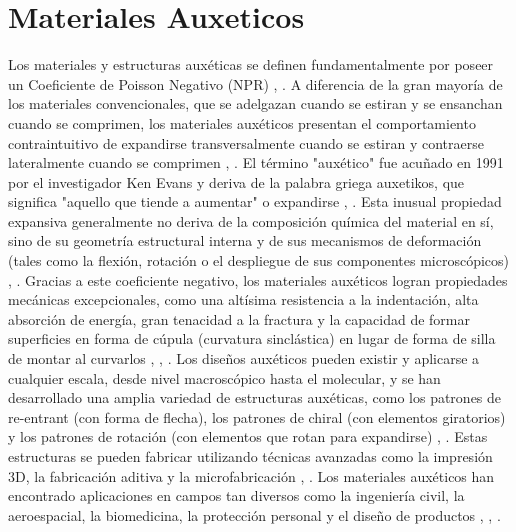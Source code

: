 \section{Materiales Auxeticos}
Los materiales y estructuras auxéticas se definen fundamentalmente por poseer un Coeficiente de Poisson Negativo (NPR) , . A diferencia de la gran mayoría de los materiales convencionales, que se adelgazan cuando se estiran y se ensanchan cuando se comprimen, los materiales auxéticos presentan el comportamiento contraintuitivo de expandirse transversalmente cuando se estiran y contraerse lateralmente cuando se comprimen , .
El término "auxético" fue acuñado en 1991 por el investigador Ken Evans y deriva de la palabra griega auxetikos, que significa "aquello que tiende a aumentar" o expandirse , . Esta inusual propiedad expansiva generalmente no deriva de la composición química del material en sí, sino de su geometría estructural interna y de sus mecanismos de deformación (tales como la flexión, rotación o el despliegue de sus componentes microscópicos) , . Gracias a este coeficiente negativo, los materiales auxéticos logran propiedades mecánicas excepcionales, como una altísima resistencia a la indentación, alta absorción de energía, gran tenacidad a la fractura y la capacidad de formar superficies en forma de cúpula (curvatura sinclástica) en lugar de forma de silla de montar al curvarlos , , .
Los diseños auxéticos pueden existir y aplicarse a cualquier escala, desde nivel macroscópico hasta el molecular, y se han desarrollado una amplia variedad de estructuras auxéticas, como los patrones de re-entrant (con forma de flecha), los patrones de chiral (con elementos giratorios) y los patrones de rotación (con elementos que rotan para expandirse) , . Estas estructuras se pueden fabricar utilizando técnicas avanzadas como la impresión 3D, la fabricación aditiva y la microfabricación , . Los materiales auxéticos han encontrado aplicaciones en campos tan diversos como la ingeniería civil, la aeroespacial, la biomedicina, la protección personal y el diseño de productos , , .

